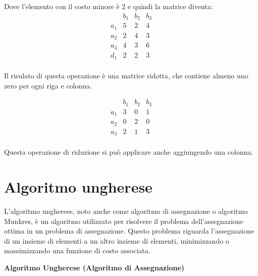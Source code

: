 Dove l'elemento con il costo minore \`e $2$ e quindi la matrice diventa:
\[
  \begin{array}{cccc}
      & b_1 & b_2 & b_3 \\
  a_1 & 5   & 2   & 4   \\
  a_2 & 2   & 4   & 3   \\
  a_3 & 4   & 3   & 6   \\
  d_1 & 2   & 2   & 3   \\
  \end{array}
\]


Il risulato di questa operazione \`e una matrice ridotta, che contiene almeno uno zero per ogni riga e colonna.

\[
  \begin{array}{cccc}
      & b_1 & b_2 & b_3 \\
  a_1 & 3   & 0   & 1   \\
  a_2 & 0   & 2   & 0   \\
  a_3 & 2   & 1   & 3   \\
  \end{array}
\]

Questa operazione di riduzione si pu\`o applicare anche aggiungendo una colonna.


\section{Algoritmo ungherese}
L'algoritmo ungherese, noto anche come algoritmo di assegnazione o algoritmo Munkres, è un algoritmo utilizzato per risolvere il problema dell'assegnazione ottima in un problema di assegnazione. Questo problema riguarda l'assegnazione di un insieme di elementi a un altro insieme di elementi, minimizzando o massimizzando una funzione di costo associata.

\textbf{Algoritmo Ungherese (Algoritmo di Assegnazione)}

